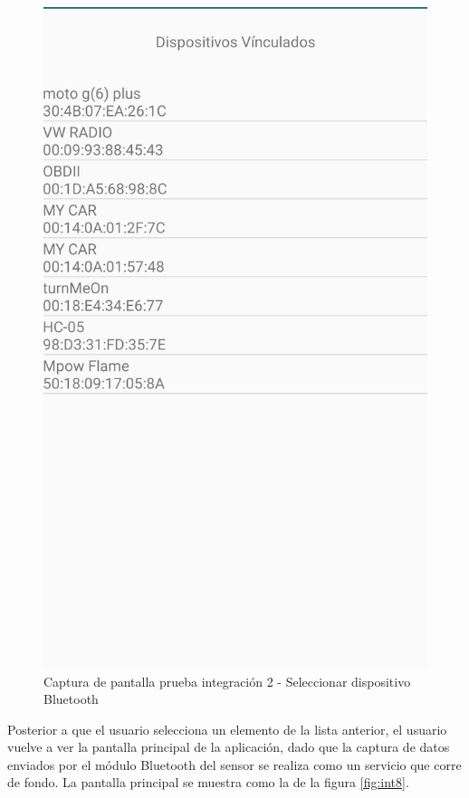 \begin{figure}[H]
	\centering
	\includegraphics[scale=.2]{DocumentoTecnico/Capitulo6/integracion/Software/images/7.png}
	\caption{Captura de pantalla prueba integración 2 - Seleccionar dispositivo Bluetooth}
	\label{fig:int7}
\end{figure}

Posterior a que el usuario selecciona un elemento de la lista anterior, el usuario vuelve a ver la pantalla principal de la aplicación, dado que la captura de datos enviados por el módulo Bluetooth del sensor se realiza como un servicio que corre de fondo. La pantalla principal se muestra como la de la figura \ref{fig:int8}.


